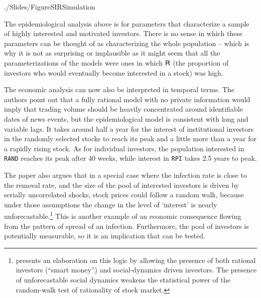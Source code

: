 \begin{verbatimwrite}{./Slides/FigureSIRSimulation}
\begin{figure}
\begin{flushleft}
		\end{flushleft}
	\end{figure}
\end{verbatimwrite}%

The epidemiological analysis above is for parameters that characterize a sample of highly interested and motivated investors.  There is no sense in which these parameters can be thought of as characterizing the whole population -- which is why it is not as surprising or implausible as it might seem that all the parameterizations of the models were ones in which $\mathsf{R}$ (the proportion of investors who would eventually become interested in a stock) was high.

The economic analysis can now also be interpreted in temporal terms.  The authors point out that a fully rational model with no private information would imply that trading volume should be heavily concentrated around identifiable dates of news events, but the epidemiological model is consistent with long and variable lags.  It takes around half a year for the interest of institutional investors in the randomly selected stocks to reach its peak and a little more than a year for a rapidly rising stock. As for individual investors, the population interested in \texttt{RAND} reaches its peak after 40 weeks, while interest in \texttt{RPI} takes 2.5 years to peak.



The paper also argues that in a special case where the infection rate is close to the removal rate, and the size of the pool of interested investors is driven by serially uncorrelated shocks, stock prices could follow a random walk, because under those assumptions the change in the level of `interest' is nearly unforecastable.\footnote{\cite{shiller1984stock} presents an  elaboration on this logic by allowing the presence of both rational investors (``smart money'') and social-dynamics driven investors. The presence of unforecastable social dynamics weakens the statistical power of the random-walk test of rationality of stock market.} This is another example of an economic consequence flowing from the pattern of spread of an infection.  Furthermore, the pool of investors is potentially measurable, so it is an implication that can be tested.

